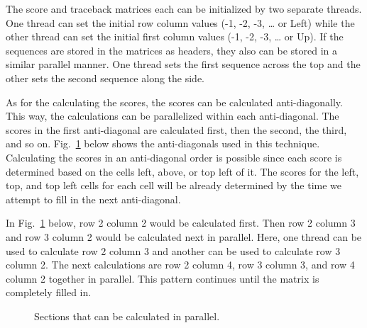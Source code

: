 \documentclass[conference]{IEEEtran}
\begin{document}
The score and traceback matrices each can be initialized by two separate threads. One thread can set the initial row column values (-1, -2, -3, … or Left) while the other thread can set the initial first column values (-1, -2, -3, … or Up). If the sequences are stored in the matrices as headers, they also can be stored in a similar parallel manner. One thread sets the first sequence across the top and the other sets the second sequence along the side.

As for the calculating the scores, the scores can be calculated anti-diagonally. This way, the calculations can be parallelized within each anti-diagonal. The scores in the first anti-diagonal are calculated first, then the second, the third, and so on. Fig.~\ref{8} below shows the anti-diagonals used in this technique. Calculating the scores in an anti-diagonal order is possible since each score is determined based on the cells left, above, or top left of it. The scores for the left, top, and top left cells for each cell will be already determined by the time we attempt to fill in the next anti-diagonal.

In Fig.~\ref{8} below, row 2 column 2 would be calculated first. Then row 2 column 3 and row 3 column 2 would be calculated next in parallel. Here, one thread can be used to calculate row 2 column 3 and another can be used to calculate row 3 column 2. The next calculations are row 2 column 4, row 3 column 3, and row 4 column 2 together in parallel. This pattern continues until the matrix is completely filled in.

\begin{figure}[htbp]
\centerline{}
\caption{Sections that can be calculated in parallel. \cite{naveed_siddiqui_ahmed}}
\label{8}
\end{figure}
\end{document}
